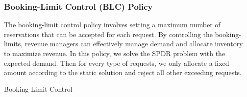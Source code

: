 \subsubsection*{Booking-Limit Control (BLC) Policy}
The booking-limit control policy involves setting a maximum number of reservations that can be accepted for each request. By controlling the booking-limits, revenue managers can effectively manage demand and allocate inventory to maximize revenue. In this policy, we solve the SPDR problem with the expected demand. Then for every type of requests, we only allocate a fixed amount according to the static solution and reject all other exceeding requests. 



\begin{algorithm}[H]
  \caption{Booking-Limit Control}\label{algo_booking}
\end{algorithm}




\newpage
